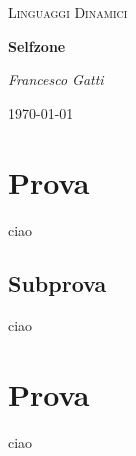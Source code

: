 \documentclass{article}
\begin{document}
\begin{titlepage}
	\centering
	{\scshape\LARGE Linguaggi Dinamici\par}
	\vspace{1cm}
	{\huge\bfseries Selfzone\par}
	\vspace{2cm}
	{\Large\itshape Francesco Gatti\par}
	\vfill

	{\large \today\par}
\end{titlepage}

\renewcommand{\contentsname}{Indice}
\tableofcontents
\clearpage

\section{Prova}
ciao
\subsection{Subprova}
ciao

\section{Prova}
ciao
\end{document}
